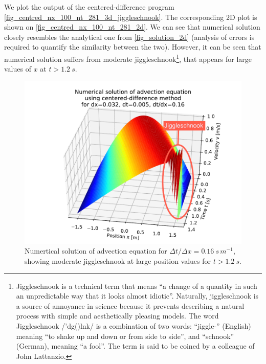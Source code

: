 We plot the output of the centered-difference program \autoref{fig_centred_nx_100_nt_281_3d_jiggleschnook}. The corresponding 2D plot is shown on \autoref{fig_centred_nx_100_nt_281_2d}. We can see that numerical solution closely resembles the analytical one from \autoref{fig_solution_2d} (analysis of errors is required to quantify the similarity between the two). However, it can be seen that numerical solution suffers from moderate jiggleschnook\footnote{Jiggleschnook is a technical term that means ``a change of a quantity in such an unpredictable way that it looks almost idiotic''.  Naturally, jiggleschnook is a source of annoyance in science because it prevents describing a natural process with simple and aesthetically pleasing models. The word Jiggleschnook /'d\textyogh\textsci g(\textschwa)l\textesh n\textupsilon k/ is a combination of two words: ``jiggle-'' (English) meaning ``to shake up and down or from side to side'', and ``schnook'' (German), meaning ``a fool''. The term is said to be coined by a colleague of John Lattanzio.}, that appears for large values of $x$ at $t > 1.2 \ s$.
\begin{figure}[H]
  \vspace*{-5mm}
  \centering
  \includegraphics[width=1.0\textwidth]{figures/numerical/centred_nx_100_nt_281_3d_jiggleschnook_flat.pdf}
  \vspace*{-10mm}
  \caption{Numertical solution of advection equation for $\Delta t / \Delta x = 0.16 \ s \, m^{-1}$, showing moderate jiggleschnook at large position values for $t > 1.2 \ s$.}
  \label{fig_centred_nx_100_nt_281_3d_jiggleschnook}
  \vspace*{-10mm}
\end{figure}

